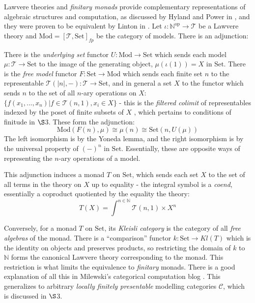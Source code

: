 \documentclass[a4paper,UKenglish]{article}
\theoremstyle{definition}
\def\ld{\rotatebox[origin=c]{-90}{$\dashv$}} %
\newcommand{\Set}{\mathrm{Set}}
\newcommand{\Mod}{\mathrm{Mod}}
\newcommand{\op}{\mathrm{op}}
\newcommand{\NN}{\mathbb{N}}
\newcommand{\C}{\mathscr{C}}
\newcommand{\T}{\mathscr{T}}
\begin{document}
Lawvere theories and \textit{finitary monads} provide complementary representations of algebraic structures and computation, as discussed by Hyland and Power in \cite{ltam}, and they were proven to be equivalent by Linton in \cite{linton}. Let $\iota: \NN^\op \to \T$ be a Lawvere theory and $\Mod = [\T,\Set]_{fp}$ be the category of models. There is an adjunction:

\begin{center}
\end{center}

There is the \textit{underlying set} functor $U:\Mod \to \Set$ which sends each model $\mu: \T \to \Set$ to the image of the generating object, $\mu(\iota(1)) = X$ in $\Set$. There is the \textit{free model} functor $F:\Set \to \Mod$ which sends each finite set $n$ to the representable $\T(|n|,-):\T \to \Set$, and in general a set $X$ to the functor which sends $n$ to the set of all $n$-ary operations on $X$: $\{f(x_1,...,x_n)|f\in \T(n,1), x_i\in X\}$ - this is the \textit{filtered colimit} of representables indexed by the poset of finite subsets of $X$ \cite{nlab}, which pertains to conditions of finitude in $\S$3. These form the adjunction: $$\Mod(F(n),\mu) \cong \mu(n) \cong \Set(n,U(\mu))$$ The left isomorphism is by the Yoneda lemma, and the right isomorphism is by the universal property of $(-)^n$ in $\Set$. Essentially, these are opposite ways of representing the $n$-ary operations of a model.

This adjunction induces a monad $T$ on $\Set$, which sends each set $X$ to the set of all terms in the theory on $X$ up to equality - the integral symbol is a \textit{coend}, essentially a coproduct quotiented by the equality the theory: $$T(X) = \int^{n\in \NN} \T(n,1) \times X^n$$

Conversely, for a monad $T$ on $\Set$, its \textit{Kleisli category} is the category of all \textit{free algebras} of the monad. There is a ``comparison'' functor $k: \Set \to Kl(T)$ which is the identity on objects and preserves products, so restricting the domain of $k$ to $\NN$ forms the canonical Lawvere theory corresponding to the monad. This restriction is what limits the equivalence to \textit{finitary} monads. There is a good explanation of all this in Milewski's categorical computation blog \cite{milew}. This generalizes to arbitrary \textit{locally finitely presentable} modelling categories $\C$, which is discussed in $\S$3.
\end{document}
